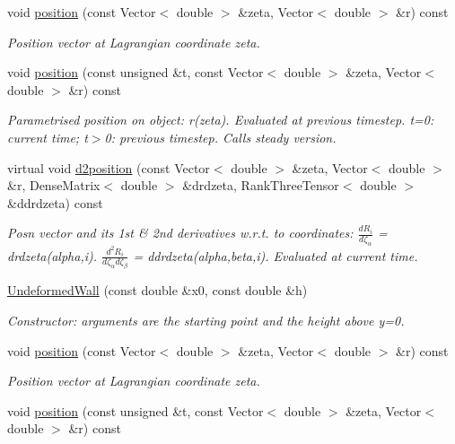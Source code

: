 \begin{DoxyCompactItemize}
void \hyperlink{classUndeformedWall_ab0410681e2096091319a79e79937cba3}{position} (const Vector$<$ double $>$ \&zeta, Vector$<$ double $>$ \&r) const
\begin{DoxyCompactList}\small\item\em Position vector at Lagrangian coordinate zeta. \end{DoxyCompactList}\item 
void \hyperlink{classUndeformedWall_a9cbb52e30fd47d1841c1c3dc812f4b96}{position} (const unsigned \&t, const Vector$<$ double $>$ \&zeta, Vector$<$ double $>$ \&r) const
\begin{DoxyCompactList}\small\item\em Parametrised position on object\+: r(zeta). Evaluated at previous timestep. t=0\+: current time; t$>$0\+: previous timestep. Calls steady version. \end{DoxyCompactList}\item 
virtual void \hyperlink{classUndeformedWall_a709e65fc95e9443a886125e455595e5d}{d2position} (const Vector$<$ double $>$ \&zeta, Vector$<$ double $>$ \&r, Dense\+Matrix$<$ double $>$ \&drdzeta, Rank\+Three\+Tensor$<$ double $>$ \&ddrdzeta) const
\begin{DoxyCompactList}\small\item\em Posn vector and its 1st \& 2nd derivatives w.\+r.\+t. to coordinates\+: $ \frac{dR_i}{d \zeta_\alpha}$ = drdzeta(alpha,i). $ \frac{d^2R_i}{d \zeta_\alpha d \zeta_\beta}$ = ddrdzeta(alpha,beta,i). Evaluated at current time. \end{DoxyCompactList}\item 
\hyperlink{classUndeformedWall_ad09cfdcd234be0ab47eb97a8a470602a}{Undeformed\+Wall} (const double \&x0, const double \&h)
\begin{DoxyCompactList}\small\item\em Constructor\+: arguments are the starting point and the height above y=0. \end{DoxyCompactList}\item 
void \hyperlink{classUndeformedWall_ab0410681e2096091319a79e79937cba3}{position} (const Vector$<$ double $>$ \&zeta, Vector$<$ double $>$ \&r) const
\begin{DoxyCompactList}\small\item\em Position vector at Lagrangian coordinate zeta. \end{DoxyCompactList}\item 
void \hyperlink{classUndeformedWall_a9cbb52e30fd47d1841c1c3dc812f4b96}{position} (const unsigned \&t, const Vector$<$ double $>$ \&zeta, Vector$<$ double $>$ \&r) const

\end{DoxyCompactItemize}
